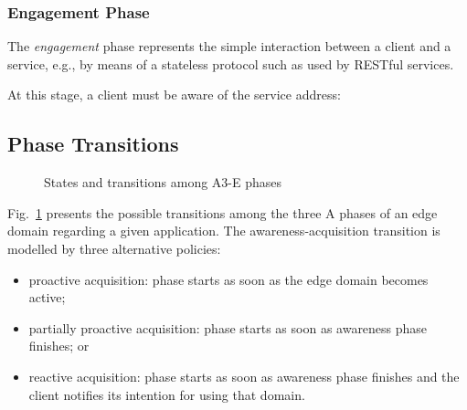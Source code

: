\subsubsection{Engagement Phase}\label{sec:A3-E-engagement}

The \textit{engagement} phase represents the simple interaction between a client and a service, e.g., by means of a stateless protocol such as used by RESTful services. 

At this stage, a client must be aware of the service address: 

\subsection{Phase Transitions}

\begin{figure}[htbp]
	\raggedright
	\hfill
	
	\hfill
	\caption{States and transitions among A3-E phases} \label{fig:A3-E-phases}
\end{figure}



Fig.~\ref{fig:A3-E-phases} presents the possible transitions among the three A phases of an edge domain regarding a given application. The awareness-acquisition transition is modelled by three alternative policies: 

\begin{itemize}

\item proactive acquisition: phase starts as soon as the edge domain becomes active; 

\item partially proactive acquisition: phase starts as soon as awareness phase finishes; or

\item reactive acquisition: phase starts as soon as awareness phase finishes and the client notifies its intention for using that domain.

\end{itemize}

